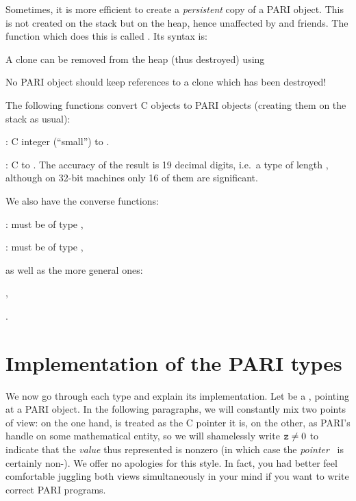 \label{se:clone}
Sometimes, it is more efficient to create a \emph{persistent} copy of a PARI
object. This is not created on the stack but on the heap, hence unaffected by
 and friends. The function which does this is called
. Its syntax is:


A clone can be removed from the heap (thus destroyed) using


\noindent No PARI object should keep references to a clone which has been
destroyed!

The following functions convert C objects to PARI objects (creating them on
the stack as usual):

: C  integer  (``small'') to .

: C  to . The accuracy of
the result is 19 decimal digits, i.e.~a type  of length
, although on 32-bit machines only 16 of them are
significant.

\noindent We also have the converse functions:

:  must be of type ,

:  must be of type ,

\noindent as well as the more general ones:

,

.

\section{Implementation of the PARI types}
\label{se:impl}

\noindent
We now go through each type and explain its implementation. Let  be a
, pointing at a PARI object. In the following paragraphs, we will
constantly mix two points of view: on the one hand,  is treated as the
C pointer it is, on the other, as PARI's handle on some mathematical entity,
so we will shamelessly write ${\tt z} \ne 0$ to indicate that the
\emph{value} thus represented is nonzero (in which case the
\emph{pointer}~ is certainly non-). We offer no apologies
for this style. In fact, you had better feel comfortable juggling both views
simultaneously in your mind if you want to write correct PARI programs.

